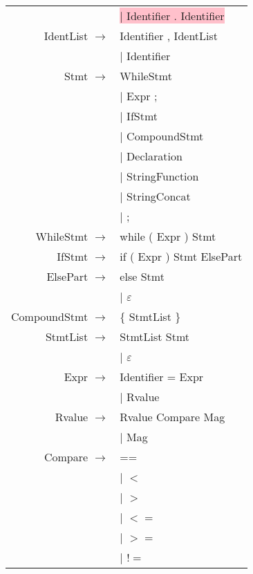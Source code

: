 \documentclass[12pt]{article}
\begin{document}
\begin{longtable}{ r l }
									& \colorbox{pink}{$|$ Identifier . Identifier}\\
	IdentList		$\rightarrow$ 	& Identifier , IdentList \\
									& $|$ Identifier \\
	Stmt 			$\rightarrow$ 	& WhileStmt \\
									& $|$ Expr ; \\
									& $|$ IfStmt \\
									& $|$ CompoundStmt \\
									& $|$ Declaration \\
									& $|$ StringFunction \\
									& $|$ StringConcat \\
									& $|$ ; \\
	WhileStmt		$\rightarrow$ 	& while ( Expr ) Stmt \\
	IfStmt			$\rightarrow$ 	& if ( Expr ) Stmt ElsePart \\
	ElsePart		$\rightarrow$ 	& else Stmt \\
									& $|$ $\varepsilon$ \\
	CompoundStmt	$\rightarrow$ 	& \{ StmtList \} \\
	StmtList		$\rightarrow$ 	& StmtList Stmt \\
									& $|$ $\varepsilon$ \\
	Expr			$\rightarrow$ 	& Identifier = Expr \\
									& $|$ Rvalue \\
	Rvalue			$\rightarrow$ 	& Rvalue Compare Mag \\
									& $|$ Mag \\
	Compare			$\rightarrow$ 	& ==  \\
									& $|$ $<$ \\
									& $|$ $>$ \\
									& $|$ $<=$ \\
									& $|$ $>=$ \\
									& $|$ $!=$ \\

\end{longtable}
\end{document}
